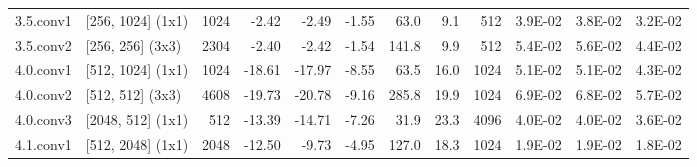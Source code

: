 \begin{table}
\begin{tabular}{llrrrrrrrrrr}
3.5.conv1 & [256, 1024] (1x1) & 1024 & {\cellcolor[HTML]{FFFDBC}} \color[HTML]{000000} -2.42 & {\cellcolor[HTML]{FFFCBA}} \color[HTML]{000000} -2.49 & {\cellcolor[HTML]{F8FCB6}} \color[HTML]{000000} -1.55 & 63.0 & 9.1 & 512 & {\cellcolor[HTML]{FDBB6C}} \color[HTML]{000000} 3.9E-02 & {\cellcolor[HTML]{FDC171}} \color[HTML]{000000} 3.8E-02 & {\cellcolor[HTML]{FEE18D}} \color[HTML]{000000} 3.2E-02 \\
3.5.conv2 & [256, 256] (3x3) & 2304 & {\cellcolor[HTML]{FFFDBC}} \color[HTML]{000000} -2.40 & {\cellcolor[HTML]{FFFDBC}} \color[HTML]{000000} -2.42 & {\cellcolor[HTML]{F8FCB6}} \color[HTML]{000000} -1.54 & 141.8 & 9.9 & 512 & {\cellcolor[HTML]{E75337}} \color[HTML]{F1F1F1} 5.4E-02 & {\cellcolor[HTML]{E24731}} \color[HTML]{F1F1F1} 5.6E-02 & {\cellcolor[HTML]{FB9D59}} \color[HTML]{000000} 4.4E-02 \\
4.0.conv1 & [512, 1024] (1x1) & 1024 & {\cellcolor[HTML]{C01A27}} \color[HTML]{F1F1F1} -18.61 & {\cellcolor[HTML]{CA2427}} \color[HTML]{F1F1F1} -17.97 & {\cellcolor[HTML]{FDBD6D}} \color[HTML]{000000} -8.55 & 63.5 & 16.0 & 1024 & {\cellcolor[HTML]{F36B42}} \color[HTML]{F1F1F1} 5.1E-02 & {\cellcolor[HTML]{F36B42}} \color[HTML]{F1F1F1} 5.1E-02 & {\cellcolor[HTML]{FBA05B}} \color[HTML]{000000} 4.3E-02 \\
4.0.conv2 & [512, 512] (3x3) & 4608 & {\cellcolor[HTML]{B30D26}} \color[HTML]{F1F1F1} -19.73 & {\cellcolor[HTML]{A50026}} \color[HTML]{F1F1F1} -20.78 & {\cellcolor[HTML]{FDB365}} \color[HTML]{000000} -9.16 & 285.8 & 19.9 & 1024 & {\cellcolor[HTML]{A50026}} \color[HTML]{F1F1F1} 6.9E-02 & {\cellcolor[HTML]{A50026}} \color[HTML]{F1F1F1} 6.8E-02 & {\cellcolor[HTML]{DE402E}} \color[HTML]{F1F1F1} 5.7E-02 \\
4.0.conv3 & [2048, 512] (1x1) & 512 & {\cellcolor[HTML]{F36B42}} \color[HTML]{F1F1F1} -13.39 & {\cellcolor[HTML]{E95538}} \color[HTML]{F1F1F1} -14.71 & {\cellcolor[HTML]{FECC7B}} \color[HTML]{000000} -7.26 & 31.9 & 23.3 & 4096 & {\cellcolor[HTML]{FDB567}} \color[HTML]{000000} 4.0E-02 & {\cellcolor[HTML]{FDB567}} \color[HTML]{000000} 4.0E-02 & {\cellcolor[HTML]{FECC7B}} \color[HTML]{000000} 3.6E-02 \\
4.1.conv1 & [512, 2048] (1x1) & 2048 & {\cellcolor[HTML]{F67A49}} \color[HTML]{F1F1F1} -12.50 & {\cellcolor[HTML]{FCAA5F}} \color[HTML]{000000} -9.73 & {\cellcolor[HTML]{FEE797}} \color[HTML]{000000} -4.95 & 127.0 & 18.3 & 1024 & {\cellcolor[HTML]{EBF7A3}} \color[HTML]{000000} 1.9E-02 & {\cellcolor[HTML]{EBF7A3}} \color[HTML]{000000} 1.9E-02 & {\cellcolor[HTML]{E8F59F}} \color[HTML]{000000} 1.8E-02 \\

\end{tabular}
\end{table}

